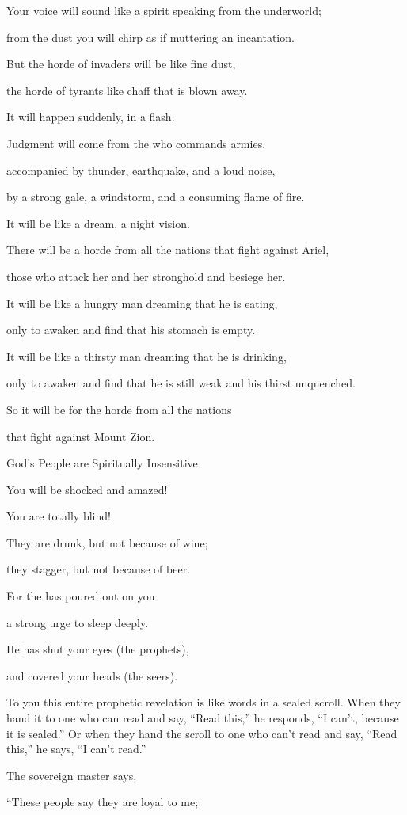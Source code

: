 {\par }{\Q Your voice
will sound like a spirit
speaking from the underworld;
\par }{\Q from the dust
you will chirp
as if muttering an incantation.
\par }{\Q {}But the horde
of invaders
will be
like fine
dust,
\par }{\Q the horde
of tyrants
like chaff
that is blown away.
\par }{\Q It will happen
suddenly,
in a flash.
\par }{\Q {}Judgment
will come from
the {}
who commands armies,
\par }{\Q accompanied by thunder,
earthquake,
and a loud noise,
\par }{\Q by a strong
gale,
a windstorm,
and a consuming
flame
of fire.
\par }{\Q {}It will be
like a dream,
a night
vision.
\par }{\Q There will be a horde
from all
the nations
that fight against
Ariel,
\par }{\Q those who
attack
her and her stronghold
and besiege her.
\par }{\Q {}It will be
like a hungry
man dreaming
that
he is
eating,
\par }{\Q only to awaken
and find that
his
stomach
is
empty.
\par }{\Q It will be like a
thirsty
man dreaming
that
he is
drinking,
\par }{\Q only to awaken
and find
that he is
still weak
and his
thirst unquenched.
\par }{\Q So
it will be
for the horde from
all
the
nations
\par }{\Q that fight against
Mount
Zion.
\par }{\SH God’s People are Spiritually Insensitive
\par }{\Q {}You will be shocked
and amazed!

\par }{\Q You are totally blind!

\par }{\Q They are drunk,
but not
because of wine;
\par }{\Q they stagger,
but not
because of beer.
\par }{\Q {}For
the
{}
has poured out
on
you
\par }{\Q a strong urge
to sleep deeply.
\par }{\Q He has shut
your eyes
(the prophets),
\par }{\Q and covered
your heads
(the seers).
\par }{\PP {}To you this entire
prophetic revelation
is like words
in a sealed
scroll.
When they hand
it to
one who
can
read
and say,
“Read
this,”
he responds,
“I can’t,
because
it is
sealed.”
Or when they hand
the scroll
to
one who
can’t
read
and say,
“Read
this,”
he says,
“I can’t
read.”
\par }{\Q {}The sovereign master
says,
\par }{\Q “These
people
say
they are loyal
to me;

}

